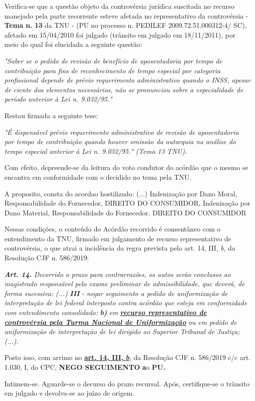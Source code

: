 \documentclass[12pt]{article}
\begin{document}
\justifying
\noindent Verifica-se que a questão objeto da controvérsia jurídica suscitada no recurso manejado pela parte recorrente esteve afetada no representativo da controvérsia - \textbf{Tema n. }\textbf{13} da TNU - (PU no processo n. PEDILEF 2009.72.51.000312-4/ SC),  afetado em 15/04/2010 foi julgado (trânsito em julgado em 18/11/2011), por meio do qual foi elucidada a seguinte questão:

\noindent \textit{"Saber se o pedido de revisão de benefício de aposentadoria por tempo de contribuição para fins de reconhecimento de tempo especial por categoria profissional depende de prévio requerimento administrativo quando o INSS, apesar de ciente dos elementos necessários, não se pronunciou sobre a especialidade de período anterior à Lei n. 9.032/95."}

\noindent Restou firmada a seguinte tese:

\noindent \textit{"É dispensável prévio requerimento administrativo de revisão de aposentadoria por tempo de contribuição quando houver omissão da autarquia na análise do tempo especial anterior à Lei n. 9.032/95." (Tema 13 TNU).}

\noindent Com efeito, depreende-se da leitura do voto condutor do acórdão que o mesmo se encontra em conformidade com o decidido no  tema pela TNU.

\noindent A proposito, consta do acordao hostilizado: (...) Indenização por Dano Moral, Responsabilidade do Fornecedor, DIREITO DO CONSUMIDOR, Indenização por Dano Material, Responsabilidade do Fornecedor, DIREITO DO CONSUMIDOR

\noindent Nessas condições, o conteúdo do Acórdão recorrido é consentâneo com o entendimento da TNU, firmado em julgamento de recurso representativo de controvérsia, o que atrai a incidência da regra prevista pelo art. 14, III, \textit{b,} da Resolução CJF n. 586/2019:

\noindent \textit{\textbf{Art. 14.}}\textit{ Decorrido o prazo para contrarrazões, os autos serão conclusos ao magistrado responsável pelo exame preliminar de admissibilidade, que deverá, de forma sucessiva: (...) }\textit{\textbf{III }}\textit{- negar seguimento a pedido de uniformização de interpretação de lei federal interposto contra acórdão que esteja em conformidade com entendimento consolidado: }\textit{\textbf{b)}}\textit{ em }\uline{\textit{\textbf{recurso representativo de controvérsia pela Turma Nacional de Uniformização}}}\textit{ ou em pedido de uniformização de interpretação de lei dirigido ao Superior Tribunal de Justiça;(...).}

\noindent Posto isso, com arrimo no \uline{\textbf{art. 14, III, }}\uline{\textit{\textbf{b}}}\textit{,} da Resolução CJF n. 586/2019 c/c art. 1.030, I, do CPC, \textbf{NEGO SEGUIMENTO }\textbf{a}o\textbf{ PU}\textbf{.}

\noindent Intimem-se. Aguarde-se o decurso do prazo recursal. Após, certifique-se o trânsito em julgado e devolva-se ao juízo de origem.
\end{document}
